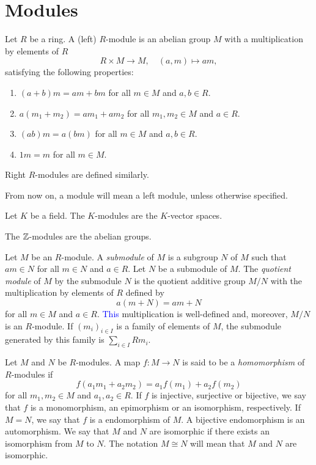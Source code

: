 \section{Modules}

Let $R$ be a ring. A (left) $R$-module is an abelian group $M$ with a multiplication by elements of $R$
\[
R\times M\to M,\quad
(a,m)\mapsto am,
\]
satisfying the following properties:
\begin{enumerate}
	\item $(a+b)m=am+bm$ for all $m\in M$ and $a,b\in R$. 
    \item $a(m_1+m_2)=am_1+am_2$ for all $m_1,m_2\in M$ and $a\in R$.
    \item $(ab)m=a(bm)$ for all $m\in M$ and $a,b\in R$.
    \item $1m=m$ for all $m\in M$.
\end{enumerate}

Right $R$-modules are defined similarly.

\begin{convention}
From now on, a module will mean a left module, unless otherwise specified. 
\end{convention}

\begin{example}
	Let $K$ be a field. The  $K$-modules are the $K$-vector spaces.
\end{example}

\begin{example}
    The $\mathbb{Z}$-modules are the abelian groups.
\end{example}


Let $M$ be an $R$-module. A {\em submodule} of $M$ is a subgroup $N$ of $M$
such that $am\in N$ for all $m\in N$ and $a\in R$. Let $N$ be a submodule of $M$. 
The {\em quotient module} 
of $M$ by the submodule $N$ is
the quotient additive group $M/N$ with the multiplication by elements of $R$ defined by
\[
a(m+N)=am+N
\]
for all $m\in M$ and $a\in R$.
\textcolor{blue}{This} multiplication is well-defined and, moreover, 
$M/N$ is an $R$-module. If $(m_i)_{i\in I}$ is a family of elements of $M$, 
the submodule generated by this family is 
$\sum_{i \in I}Rm_i$.

Let $M$ and $N$ be $R$-modules. A map $f\colon M\rightarrow
N$ is said to be a {\em homomorphism} of $R$-modules if
\[
f(a_1m_1+a_2m_2)=a_1f(m_1)+a_2f(m_2)
\]
for all $m_1,m_2\in M$ and $a_1,a_2\in R$.
If $f$ is injective, surjective or bijective, we say that $f$ is
a monomorphism, an epimorphism or an isomorphism, respectively. If $M=N$, we say that
$f$ is a endomorphism of $M$. A bijective endomorphism is an
automorphism. We say that $M$ and $N$ are isomorphic if there exists 
an isomorphism from $M$ to $N$. The notation
$M\cong N$ will mean that $M$ and $N$ are isomorphic.

